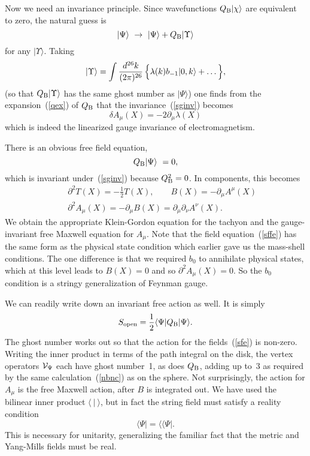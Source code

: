 Now we need an invariance principle.  Since wavefunctions $Q_{\rm B}
| \chi \rangle$ are equivalent to zero, the natural guess is
\begin{equation}
| \Psi \rangle \ \to\ | \Psi \rangle + Q_{\rm B}
| \Upsilon \rangle \label{sginv}
\end{equation}
for any $| \Upsilon \rangle$.  Taking
\begin{equation}
| \Upsilon \rangle = \int \frac{d^{26}k}{(2\pi)^{26}}\,
\Bigl\{ \lambda (k) b_{-1} |0,k\rangle + \ldots \, \Bigr\},
\label{sfeg}
\end{equation}
(so that $Q_{\rm B} | \Upsilon \rangle$ has the same ghost number as
$| \Psi \rangle$) one finds from the expansion~(\ref{qex}) of $Q_{\rm
B}$ that the invariance~(\ref{sginv}) becomes
\begin{equation}
\delta A_\mu(X) = - 2 \partial_\mu \lambda(X)
\end{equation}
which is indeed the linearized gauge invariance of electromagnetism.

There is an obvious free field equation,
\begin{equation}
Q_{\rm B} | \Psi \rangle \ = 0, \label{sffe}
\end{equation}
which is invariant under~(\ref{sginv}) because $Q_{\rm B}^2 = 0$.
In components, this becomes
\begin{eqnarray}
&&\partial^2 T(X) = - \frac{1}{2} T(X), \qquad B(X) = - \partial_\mu
A^\mu(X) \nonumber\\
&& \partial^2 A_\mu(X) = - \partial_\mu B(X) = 
\partial_\mu \partial_\nu A^\nu(X).
\end{eqnarray}
We obtain the appropriate Klein-Gordon equation for the tachyon and
the gauge-invariant free Maxwell equation for $A_\mu$.  Note that 
the field equation~(\ref{sffe}) has the same form as the physical
state condition which earlier gave us the mass-shell conditions.
The one difference is that we required $b_0$ to annihilate physical
states, which at this level leads to $B(X) = 0$ and so
$\partial^2 A_\mu(X) = 0$.  So the $b_0$ condition is a stringy
generalization of Feynman gauge.

We can readily write down an invariant free action as well.  It is
simply
\begin{equation}
S_{\rm open}
 = \frac{1}{2} \langle \Psi | Q_{\rm B} | \Psi \rangle. \label{sfa2}
\end{equation}
The ghost number works out so that the action for
the fields~(\ref{sfe}) is non-zero.  Writing the inner product
in terms of the path integral on the disk, the vertex operators
${\cal V}_{\Psi}$ each have ghost number~1, as does $Q_{\rm B}$,
adding up to~3 as required by the same calculation~(\ref{nbnc}) as on
the sphere.  Not surprisingly, the action for $A_\mu$ is the free
Maxwell action, after $B$ is integrated out.  We have used the
bilinear inner product $\langle\ |\ \rangle$, but in fact the string
field must satisfy a reality condition
\begin{equation}
\langle \Psi | = \langle\!\langle \Psi | .
\end{equation}
This is necessary for unitarity, generalizing the familiar fact that
the metric and Yang-Mills fields must be real.

